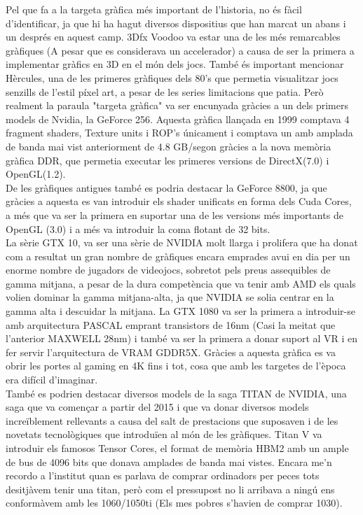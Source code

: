 \documentclass[12pt]{article}
\begin{document}
Pel que fa a la targeta gràfica més important de l'historia, no és fàcil d'identificar, ja que hi ha hagut diversos dispositius que han marcat un abans i un després en aquest camp. 3Dfx Voodoo va estar una de les més remarcables gràfiques
(A pesar que es considerava un accelerador) a causa de ser la primera a implementar gràfics en 3D en el món dels jocs. També és important mencionar Hèrcules, una de les primeres gràfiques dels 80's que permetia visualitzar jocs senzills de l'estil píxel art,
a pesar de les series limitacions que patia. Però realment la paraula "targeta gràfica" va ser encunyada gràcies a un dels primers models de Nvidia, la GeForce 256. Aquesta gràfica llançada en 1999 comptava 4 fragment shaders, Texture units i ROP's únicament i comptava un amb amplada de banda mai vist anteriorment de 4.8 GB/segon gràcies a la nova memòria gràfica DDR, que permetia executar les primeres versions de DirectX(7.0) i OpenGL(1.2).
\\

De les gràfiques antigues també es podria destacar la GeForce 8800, ja que gràcies a aquesta es van introduir els shader unificats en forma dels Cuda Cores, a més que va ser la primera en suportar una de les versions més importants de OpenGL (3.0) i a més va introduir la coma flotant de 32 bits.
\\

La sèrie GTX 10, va ser una sèrie de NVIDIA molt llarga i prolifera que ha donat com a resultat un gran nombre de gràfiques encara emprades avui en dia per un enorme nombre de jugadors de videojocs, sobretot pels preus assequibles de 
gamma mitjana, a pesar de la dura competència que va tenir amb AMD els quals volien dominar la gamma mitjana-alta, ja que NVIDIA se solia centrar en la gamma alta i descuidar la mitjana. La GTX 1080 va ser la primera a introduir-se amb arquitectura PASCAL
emprant transistors de 16nm (Casi la meitat que l'anterior MAXWELL 28nm) i també va ser la primera a donar suport al VR i en fer servir l'arquitectura de VRAM GDDR5X. Gràcies a aquesta gràfica es va obrir les portes al gaming en 4K fins i tot, cosa que amb les targetes de l'època era difícil d'imaginar.
\\

També es podrien destacar diversos models de la saga TITAN de NVIDIA, una saga que va començar a partir del 2015 i que va donar diversos models increïblement rellevants a causa del salt de prestacions que suposaven i de les novetats tecnològiques
que introduïen al món de les gràfiques. Titan V va introduir els famosos Tensor Cores, el format de memòria HBM2 amb un ample de bus de 4096 bits que donava amplades de banda mai vistes. Encara me'n recordo a l'institut quan es parlava
de comprar ordinadors per peces tots desitjàvem tenir una titan, però com el pressupost no li arribava a ningú ens conformàvem amb les 1060/1050ti (Els mes pobres s'havien de comprar 1030).
\\
\end{document}

